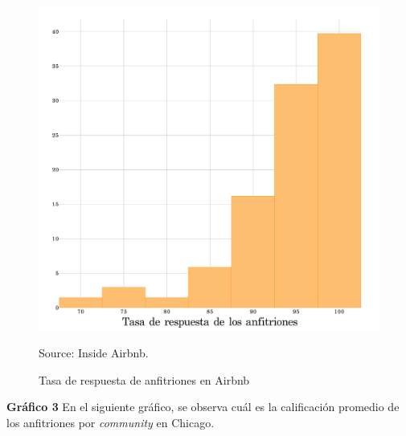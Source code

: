 \documentclass[11pt]{article}
\newcommand{\source}[1]{\caption*{Source: {#1}} }
\begin{document}
\begin{figure}[H]
    \centering
    \caption{Tasa de respuesta de anfitriones en Airbnb}
    \includegraphics[scale=0.4]{grafico 2 airbnb.png}
    \source{Inside Airbnb.}
    \label{fig:3}
\end{figure}

\newpage
\textbf{Gráfico 3} En el siguiente gráfico, se observa cuál es la calificación promedio de los anfitriones por \textit{community} en Chicago. 
\end{document}

